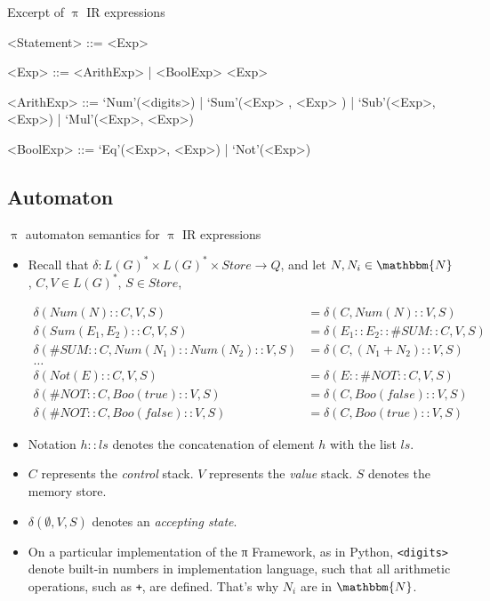 \documentclass{beamer}
\begin{document}

\begin{frame}{Excerpt of  {\color{red}$\uppi$ IR} expressions}

\begin{grammar}
<Statement>  ::=  <Exp> 

<Exp>        ::=  <ArithExp> | <BoolExp> <Exp> 

<ArithExp>  ::=  `Num'(<digits>) | `Sum'(<Exp> , <Exp> ) |  `Sub'(<Exp>, <Exp>) | `Mul'(<Exp>, <Exp>) 

<BoolExp>  ::=  `Eq'(<Exp>, <Exp>) | `Not'(<Exp>)
\end{grammar}

\end{frame}

\subsection{Automaton}


\begin{frame}{{\color{red}$\uppi$ automaton} semantics for {\color{red}$\uppi$ IR} expressions}
\begin{itemize}
\item Recall that $\delta : L(G)^* \times L(G)^* \times Store \to Q$, and let $N, N_i \in \mathbbm{N}$, $C, V \in L(G)^*$, $S \in \mathit{Store}$,
\begin{scriptsize}
\begin{align}
\delta(Num(N) :: C, V, S) & = \delta(C, Num(N) :: V, S) \\
\delta(Sum(E_1, E_2) :: C, V, S) & = \delta(E_1 :: E_2 :: \#SUM :: C, V, S) \\
\delta(\#SUM :: C, Num(N_1) :: Num(N_2) :: V, S) & = \delta(C, (N_1 + N_2) :: V, S) \\
\ldots \nonumber \\
\delta(Not(E) :: C, V, S) & = \delta(E :: \#NOT :: C, V, S) \\
\delta(\#NOT :: C, Boo(true) :: V, S) & = \delta(C, Boo(false) :: V, S) \\
\delta(\#NOT :: C, Boo(false) :: V, S) & = \delta(C, Boo(true) :: V, S) 
\end{align}
\end{scriptsize}

\item Notation $h :: ls$ denotes the concatenation of element $h$ with the list $ls$. 

\item $C$ represents the \emph{control} stack. $V$ represents the \emph{value} stack. $S$ denotes the memory store.

\item $\delta(\emptyset, V, S)$ denotes an \emph{accepting state}.

\item On a particular implementation of the π Framework, as in Python, \texttt{<digits>}
denote built-in numbers in implementation language, such that all arithmetic operations, such as \texttt{+}, are defined. 
That's why $N_i$ are in $\mathbbm{N}$.
\end{itemize}
\end{frame}
\end{document}

